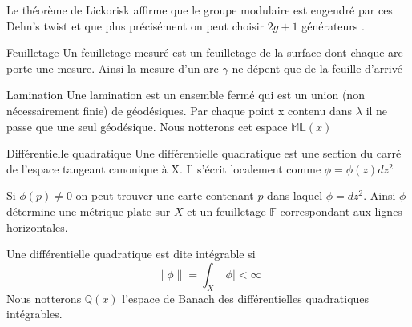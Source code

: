 \begin{rmq}
Le théorème de Lickorisk affirme que le groupe modulaire est engendré par ces Dehn's twist et que plus précisément on peut choisir $2g+1$ générateurs \cite{Lickorish1964AFS}.
\end{rmq}

\begin{dfnt}{Feuilletage}
Un feuilletage mesuré est un feuilletage de la surface dont chaque arc porte une mesure. Ainsi la mesure d'un arc $\gamma$ ne dépent que de la feuille d'arrivé
\end{dfnt}

\begin{dfnt}{Lamination}
Une lamination est un ensemble fermé qui est un union (non nécessairement finie) de géodésiques.
Par chaque point x contenu dans $\lambda$ il ne passe que une seul géodésique.
Nous notterons cet espace $\mathbb{ML}(x)$
\end{dfnt}

\begin{dfnt}{Différentielle quadratique}
Une différentielle quadratique est une section du carré de l'espace tangeant canonique à X. Il s'écrit localement comme $\phi= \phi(z) dz^2$
\end{dfnt}

\begin{rmq}
Si $\phi(p) \neq 0$ on peut trouver une carte contenant $p$ dans laquel $\phi = dz^2$.
Ainsi $\phi$ détermine une métrique plate sur $X$ et un feuilletage $\mathbb{F}$ correspondant aux lignes horizontales.
\end{rmq}

Une différentielle quadratique est dite intégrable si \[
 \| \phi \| = \int_X | \phi | < \infty
\]
Nous notterons $\mathbb{Q}(x)$ l'espace de Banach des différentielles quadratiques intégrables.
